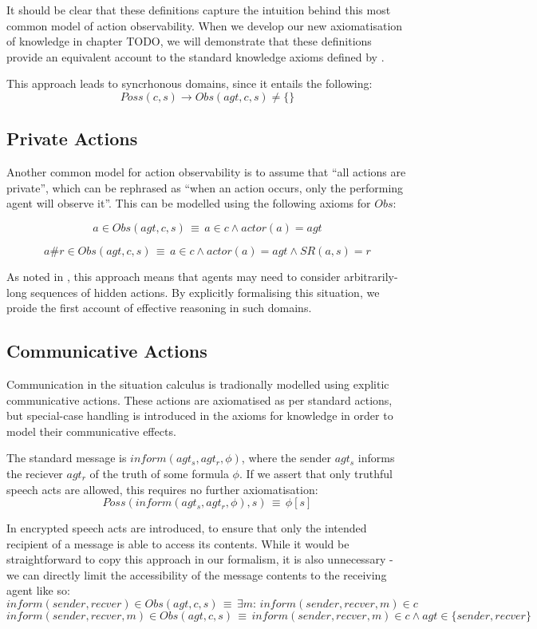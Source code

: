 It should be clear that these definitions capture the intuition behind
this most common model of action observability. When we develop our
new axiomatisation of knowledge in chapter TODO, we will demonstrate
that these definitions provide an equivalent account to the standard
knowledge axioms defined by \citet{scherl03sc_knowledge}.

This approach leads to syncrhonous domains, since it entails the following:\[
Poss(c,s)\rightarrow Obs(agt,c,s)\neq\{\}\]



\subsection{Private Actions}

Another common model for action observability is to assume that {}``all
actions are private'', which can be rephrased as {}``when an action
occurs, only the performing agent will observe it''. This can be
modelled using the following axioms for $Obs$:

\[
a\in Obs(agt,c,s)\,\equiv\, a\in c\wedge actor(a)=agt\]


\[
a\#r\in Obs(agt,c,s)\,\equiv\, a\in c\wedge actor(a)=agt\wedge SR(a,s)=r\]


As noted in \citep{Lesperance99sitcalc_approach}, this approach means
that agents may need to consider arbitrarily-long sequences of hidden
actions. By explicitly formalising this situation, we proide the first
account of effective reasoning in such domains.


\subsection{Communicative Actions}

Communication in the situation calculus is tradionally modelled using
explitic communicative actions. These actions are axiomatised as per
standard actions, but special-case handling is introduced in the axioms
for knowledge in order to model their communicative effects.

The standard message is $inform(agt_{s},agt_{r},\phi)$, where the
sender $agt_{s}$ informs the reciever $agt_{r}$ of the truth of
some formula $\phi$. If we assert that only truthful speech acts
are allowed, this requires no further axiomatisation:\[
Poss(inform(agt_{s},agt_{r},\phi),s)\,\equiv\,\phi[s]\]


In \citep{shapiro01casl_feat_inter} encrypted speech acts are introduced,
to ensure that only the intended recipient of a message is able to
access its contents. While it would be straightforward to copy this
approach in our formalism, it is also unnecessary - we can directly
limit the accessibility of the message contents to the receiving agent
like so:\[
inform(sender,recver)\in Obs(agt,c,s)\,\equiv\,\exists m:\, inform(sender,recver,m)\in c\]
 \[
inform(sender,recver,m)\in Obs(agt,c,s)\,\equiv\, inform(sender,recver,m)\in c\wedge agt\in\{sender,recver\}\]



